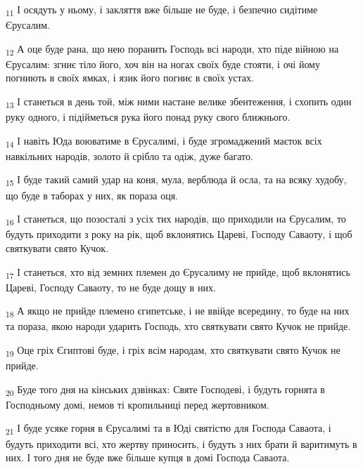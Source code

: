 \begin{tcolorbox}
\textsubscript{11} І осядуть у ньому, і закляття вже більше не буде, і безпечно сидітиме Єрусалим.
\end{tcolorbox}
\begin{tcolorbox}
\textsubscript{12} А оце буде рана, що нею поранить Господь всі народи, хто піде війною на Єрусалим: згниє тіло його, хоч він на ногах своїх буде стояти, і очі йому погниють в своїх ямках, і язик його погниє в своїх устах.
\end{tcolorbox}
\begin{tcolorbox}
\textsubscript{13} І станеться в день той, між ними настане велике збентеження, і схопить один руку одного, і підійметься рука його понад руку свого ближнього.
\end{tcolorbox}
\begin{tcolorbox}
\textsubscript{14} І навіть Юда воюватиме в Єрусалимі, і буде згромаджений маєток всіх навкільних народів, золото й срібло та одіж, дуже багато.
\end{tcolorbox}
\begin{tcolorbox}
\textsubscript{15} І буде такий самий удар на коня, мула, верблюда й осла, та на всяку худобу, що буде в таборах у них, як пораза оця.
\end{tcolorbox}
\begin{tcolorbox}
\textsubscript{16} І станеться, що позосталі з усіх тих народів, що приходили на Єрусалим, то будуть приходити з року на рік, щоб вклонятись Цареві, Господу Саваоту, і щоб святкувати свято Кучок.
\end{tcolorbox}
\begin{tcolorbox}
\textsubscript{17} І станеться, хто від земних племен до Єрусалиму не прийде, щоб вклонятись Цареві, Господу Саваоту, то не буде дощу в них.
\end{tcolorbox}
\begin{tcolorbox}
\textsubscript{18} А якщо не прийде племено єгипетське, і не ввійде всередину, то буде на них та пораза, якою народи ударить Господь, хто святкувати свято Кучок не прийде.
\end{tcolorbox}
\begin{tcolorbox}
\textsubscript{19} Оце гріх Єгиптові буде, і гріх всім народам, хто святкувати свято Кучок не прийде.
\end{tcolorbox}
\begin{tcolorbox}
\textsubscript{20} Буде того дня на кінських дзвінках: Святе Господеві, і будуть горнята в Господньому домі, немов ті кропильниці перед жертовником.
\end{tcolorbox}
\begin{tcolorbox}
\textsubscript{21} І буде усяке горня в Єрусалимі та в Юді святістю для Господа Саваота, і будуть приходити всі, хто жертву приносить, і будуть з них брати й варитимуть в них. І того дня не буде вже більше купця в домі Господа Саваота.
\end{tcolorbox}
